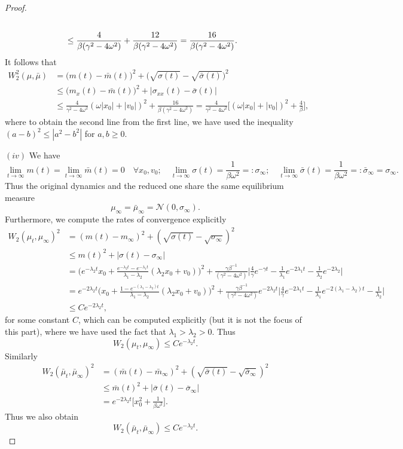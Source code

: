 \documentclass[a4paper,twoside]{article}      %
\theoremstyle{definition}
\begin{document}
\begin{proof}
\begin{align}
\\& \leq \frac{4}{\beta(\gamma^2-4\omega^2)}+\frac{12}{\beta(\gamma^2-4\omega^2)}=\frac{16}{\beta(\gamma^2-4\omega^2)}.\notag
\end{align}
It follows that
\begin{align*}
W_2^2(\mu,\bar{\mu})&=\big(m(t)-\bar{m}(t)\big)^2+\Big(\sqrt{\sigma(t)}-\sqrt{\bar{\sigma}(t)}\Big)^2
\\&\leq \big(m_x(t)-\bar{m}(t)\big)^2+|\sigma_{xx}(t)-\bar{\sigma}(t)|
\\& \leq \frac{4}{\gamma^2-4\omega^2}(\omega |x_0|+|v_0|)^2+\frac{16}{\beta(\gamma^2-4\omega^2)}=\frac{4}{\gamma^2-4\omega^2}\Big[(\omega |x_0|+|v_0|)^2+\frac{4}{\beta}\Big],
\end{align*}
where to obtain the second line from the first line, we have used the inequality $(a-b)^2\leq |a^2-b^2|$ for $a,b\geq 0$.

$(iv)$ We have
\begin{equation*}
   \lim_{t\rightarrow \infty} m(t)=\lim_{t\rightarrow \infty} \bar{m}(t)=0\quad \forall x_0, v_0;\quad \lim_{t\rightarrow \infty}\sigma(t)=\frac{1}{\beta \omega^2}=:\sigma_\infty; \quad\lim_{t\rightarrow \infty}\bar{\sigma}(t)=\frac{1}{\beta\omega^2}=:\bar{\sigma}_\infty=\sigma_\infty.
\end{equation*}
Thus the original dynamics and the reduced one share the same equilibrium measure
$$
\mu_\infty=\bar{\mu}_\infty=\mathcal{N}(0,\sigma_\infty).
$$
Furthermore, we compute the rates of convergence explicitly
\begin{align*}
W_2(\mu_t,\mu_\infty)^2&= (m(t)-m_\infty)^2+(\sqrt{\sigma(t)}-\sqrt{\sigma_\infty})^2
\\&\leq m(t)^2+|\sigma(t)-\sigma_\infty|
\\&=\Big(e^{-\lambda_2 t}x_0+\frac{e^{-\lambda_2 t}-e^{-\lambda_1 t}}{\lambda_1-\lambda_2}(\lambda_2 x_0+ v_0)\Big)^2+\frac{\gamma\beta^{-1}}{(\gamma^2-4\omega^2)}\Big|\frac{4}{\gamma}e^{-\gamma t}-\frac{1}{\lambda_1} e^{-2\lambda_1 t}-\frac{1}{\lambda_2}e^{-2\lambda_2}\Big|
\\&=e^{-2\lambda_2 t}\Big(x_0+\frac{1-e^{-(\lambda_1-\lambda_2)t}}{\lambda_1-\lambda_2}(\lambda_2 x_0+v_0)\Big)^2+\frac{\gamma\beta^{-1}}{(\gamma^2-4\omega^2)}e^{-2\lambda_2t}\Big|\frac{4}{\gamma}e^{-2\lambda_1 t}-\frac{1}{\lambda_1} e^{-2(\lambda_1-\lambda_2) t}-\frac{1}{\lambda_2}\Big|
\\&\leq C e^{-2\lambda_2 t},
\end{align*}
for some constant $C$, which can be computed explicitly (but it is not the focus of this part), where we have used the fact that $\lambda_1>\lambda_2>0$. Thus
$$
W_2(\mu_t,\mu_\infty)\leq C e^{-\lambda_2 t}.
$$
Similarly 
\begin{align*}
 W_2(\bar{\mu}_t,\bar{\mu}_\infty)^2&= (\bar{m}(t)-\bar{m}_\infty)^2+(\sqrt{\bar{\sigma}(t)}-\sqrt{\bar{\sigma}_\infty})^2
\\&\leq \bar{m}(t)^2+|\overline{\sigma}(t)-\overline{\sigma}_\infty|  \\&=e^{-2\lambda_2 t}\Big[x_0^2+\frac{1}{\beta\omega^2}\Big].
\end{align*}
Thus we also obtain 
$$
W_2(\bar{\mu}_t,\bar{\mu}_\infty)\leq C e^{-\lambda_2 t}.
$$


\end{proof}
\end{document}
